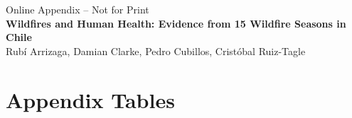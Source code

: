 \documentclass[11pt]{article}
\begin{document}
\begin{spacing}{1.3}


  \newpage
  
\appendix
\setcounter{page}{1}
\renewcommand{\thepage}{A\arabic{page}}



\begin{center}
{\Large Online Appendix -- Not for Print}\\
\textbf{Wildfires and Human Health: Evidence from 15 Wildfire Seasons in Chile} \\
Rub\'i Arrizaga, Damian Clarke, Pedro Cubillos, Crist\'obal Ruiz-Tagle
\end{center}
\end{spacing}





\setcounter{table}{0}
\renewcommand{\thetable}{A\arabic{table}}
\setcounter{figure}{0}
\renewcommand{\thefigure}{A\arabic{figure}}
    
\section{Appendix Tables}   
\label{app:Tables}





\clearpage
\end{document}
